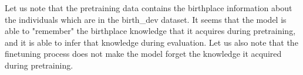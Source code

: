 Let us note that the pretraining data contains the birthplace information about the individuals which are in the birth\_dev dataset. 
It seems that the model is able to "remember" the birthplace knowledge that it acquires during pretraining, and it is able to infer that knowledge during evaluation. 
Let us also note that the finetuning process does not make the model forget the knowledge it acquired during pretraining.